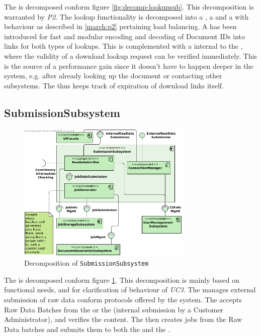 The  is decomposed conform figure \ref{fig:decomp-lookupsub}. This decomposition is warranted by \emph{P2}. The lookup functionality is decomposed into a , a  and a  with behaviour as described in \ref{march:p2} pertaining load balancing. A  has been introduced for fast and modular encoding and decoding of Document IDs into links for both types of lookups. This is complemented with a  internal to the , where the validity of a download lookup request can be verified immediately. This is the source of a performance gain since it doesn't have to happen deeper in the system, e.g. after already looking up the document or contacting other subsystems. The  thus keeps track of expiration of download links itself.

\subsection{SubmissionSubsystem}
\begin{figure}[!htp]
    \centering
    \includegraphics[width=0.75\textwidth]{figures/Submission Subsystem.png}
    \caption{Decomposition of \texttt{SubmissionSubsystem}}\label{fig:decomp-submsub}
\end{figure}

The  is decomposed conform figure \ref{fig:decomp-submsub}. This decomposition is mainly based on functional needs, and for clarification of behaviour of \emph{UC3}. The  manages external submission of raw data conform protocols offered by the system. The  accepts Raw Data Batches from the  or the  (internal submission by a Customer Administrator), and verifies the content. The  then creates jobs from the Raw Data batches and submits them to both the  and the .

